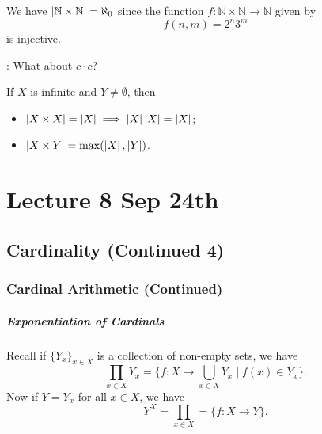 \documentclass[notoc,notitlepage]{tufte-book}
\begin{document}
\begin{eg}
  We have $\left|\mathbb{N} \times \mathbb{N}\right| = \aleph_0$ since the function $f : \mathbb{N} \times \mathbb{N} \to \mathbb{N}$ given by
  \begin{equation*}
    f(n, m) = 2^n 3^m
  \end{equation*}
  is injective.
\end{eg}

: What about $c \cdot c$?

\begin{thm}
\label{thm:multiplication_of_cardinals}
  If $X$ is infinite and $Y \neq \emptyset$, then
  \begin{itemize}
    \item $\left|X \times X\right| = \left|X\right| \implies \left|X\right| \left|X\right| = \left|X\right|$;
    \item $\left|X \times Y\right| = \max(\left|X\right|, \left|Y\right|)$.
  \end{itemize}
\end{thm}




\chapter{Lecture 8 Sep 24th}%
\label{chp:lecture_8_sep_24th}

\section{Cardinality (Continued 4)}%
\label{sec:cardinality_continued_4}

\subsection{Cardinal Arithmetic (Continued)}%
\label{sub:cardinal_arithmetic_continued}

\paragraph{Exponentiation of Cardinals} Recall if $\{Y_x\}_{x \in X}$ is a collection of non-empty sets, we have
\begin{equation*}
  \prod_{x \in X} Y_x = \{ f : X \to \bigcup_{x \in X} Y_x \mid f(x) \in Y_x \}.
\end{equation*}
Now if $Y = Y_x$ for all $x \in X$, we have
\begin{equation*}
  Y^X = \prod_{x \in X} = \{ f : X \to Y \}.
\end{equation*}
\end{document}
